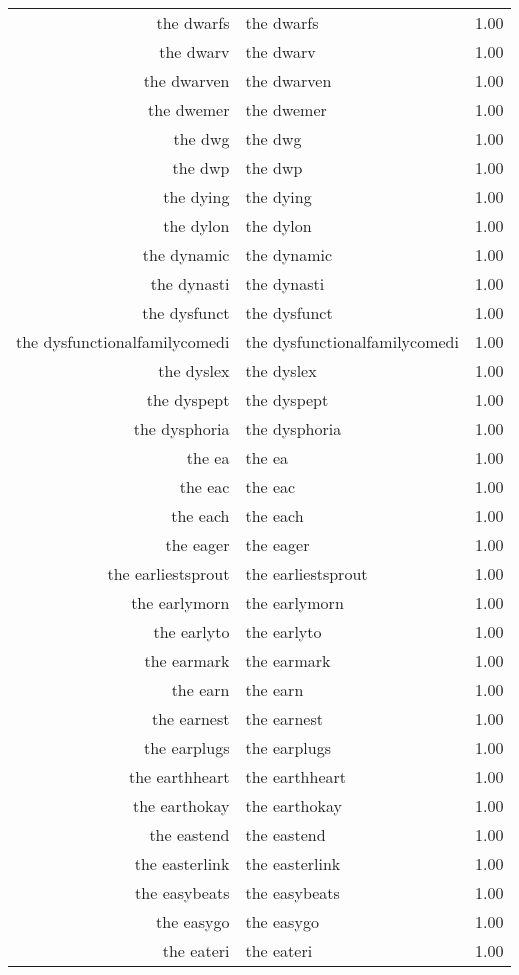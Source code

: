 \begin{table}[ht]
\begin{tabular}{rlr}
  the dwarfs & the dwarfs & 1.00 \\ 
  the dwarv & the dwarv & 1.00 \\ 
  the dwarven & the dwarven & 1.00 \\ 
  the dwemer & the dwemer & 1.00 \\ 
  the dwg & the dwg & 1.00 \\ 
  the dwp & the dwp & 1.00 \\ 
  the dying & the dying & 1.00 \\ 
  the dylon & the dylon & 1.00 \\ 
  the dynamic & the dynamic & 1.00 \\ 
  the dynasti & the dynasti & 1.00 \\ 
  the dysfunct & the dysfunct & 1.00 \\ 
  the dysfunctionalfamilycomedi & the dysfunctionalfamilycomedi & 1.00 \\ 
  the dyslex & the dyslex & 1.00 \\ 
  the dyspept & the dyspept & 1.00 \\ 
  the dysphoria & the dysphoria & 1.00 \\ 
  the ea & the ea & 1.00 \\ 
  the eac & the eac & 1.00 \\ 
  the each & the each & 1.00 \\ 
  the eager & the eager & 1.00 \\ 
  the earliestsprout & the earliestsprout & 1.00 \\ 
  the earlymorn & the earlymorn & 1.00 \\ 
  the earlyto & the earlyto & 1.00 \\ 
  the earmark & the earmark & 1.00 \\ 
  the earn & the earn & 1.00 \\ 
  the earnest & the earnest & 1.00 \\ 
  the earplugs & the earplugs & 1.00 \\ 
  the earthheart & the earthheart & 1.00 \\ 
  the earthokay & the earthokay & 1.00 \\ 
  the eastend & the eastend & 1.00 \\ 
  the easterlink & the easterlink & 1.00 \\ 
  the easybeats & the easybeats & 1.00 \\ 
  the easygo & the easygo & 1.00 \\ 
  the eateri & the eateri & 1.00 \\ 

\end{tabular}
\end{table}
